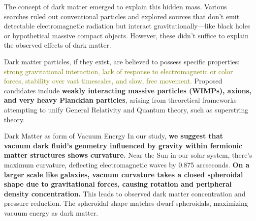 \documentclass[aspectratio=169,xcolor=dvipsnames, t]{beamer}
\begin{document}
 \begin{frame}
The concept of dark matter emerged to explain this hidden mass. Various searches ruled out conventional particles and explored sources that don't emit detectable electromagnetic radiation but interact gravitationally—like black holes or hypothetical massive compact objects. However, these didn't suffice to explain the observed effects of dark matter.

Dark matter particles, if they exist, are believed to possess specific properties: \textcolor{olive}{strong gravitational interaction, lack of response to electromagnetic or color forces, stability over vast timescales, and slow, free movement.} Proposed candidates include \textbf{weakly interacting massive particles (WIMPs), axions, and very heavy Planckian particles}, arising from theoretical frameworks attempting to unify General Relativity and Quantum theory, such as superstring theory.

\end{frame}
\begin{frame}{Dark Matter as form of Vacuum
Energy}
   In our study, \textbf{we suggest that vacuum dark fluid's geometry influenced by gravity within fermionic matter structures shows curvature.} Near the Sun in our solar system, there's maximum curvature, deflecting electromagnetic waves by 0.875 arcseconds. \textbf{On a larger scale like galaxies, vacuum curvature takes a closed spheroidal shape due to gravitational forces, causing rotation and peripheral density concentration. }This leads to observed dark matter concentration and pressure reduction. The spheroidal shape matches dwarf spheroidals, maximizing vacuum energy as dark matter. 
   \end{frame}
\end{document}
